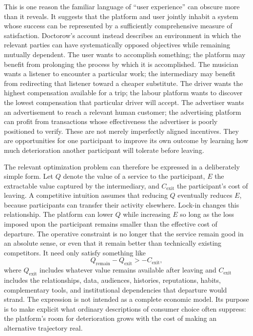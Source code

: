 \documentclass[11pt]{article}
\begin{document}
This is one reason the familiar language of ``user experience'' can obscure more than it reveals. It suggests that the platform and user jointly inhabit a system whose success can be represented by a sufficiently comprehensive measure of satisfaction. Doctorow's account instead describes an environment in which the relevant parties can have systematically opposed objectives while remaining mutually dependent. The user wants to accomplish something; the platform may benefit from prolonging the process by which it is accomplished. The musician wants a listener to encounter a particular work; the intermediary may benefit from redirecting that listener toward a cheaper substitute. The driver wants the highest compensation available for a trip; the labour platform wants to discover the lowest compensation that particular driver will accept. The advertiser wants an advertisement to reach a relevant human customer; the advertising platform can profit from transactions whose effectiveness the advertiser is poorly positioned to verify. These are not merely imperfectly aligned incentives. They are opportunities for one participant to improve its own outcome by learning how much deterioration another participant will tolerate before leaving.

The relevant optimization problem can therefore be expressed in a deliberately simple form. Let \(Q\) denote the value of a service to the participant, \(E\) the extractable value captured by the intermediary, and \(C_{\mathrm{exit}}\) the participant's cost of leaving. A competitive intuition assumes that reducing \(Q\) eventually reduces \(E\), because participants can transfer their activity elsewhere. Lock-in changes this relationship. The platform can lower \(Q\) while increasing \(E\) so long as the loss imposed upon the participant remains smaller than the effective cost of departure. The operative constraint is no longer that the service remain good in an absolute sense, or even that it remain better than technically existing competitors. It need only satisfy something like
\[
Q_{\mathrm{remain}} - Q_{\mathrm{exit}} > -C_{\mathrm{exit}},
\]
where \(Q_{\mathrm{exit}}\) includes whatever value remains available after leaving and \(C_{\mathrm{exit}}\) includes the relationships, data, audiences, histories, reputations, habits, complementary tools, and institutional dependencies that departure would strand. The expression is not intended as a complete economic model. Its purpose is to make explicit what ordinary descriptions of consumer choice often suppress: the platform's room for deterioration grows with the cost of making an alternative trajectory real.
\end{document}
